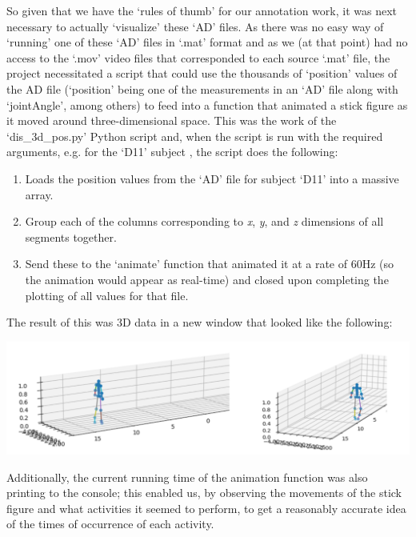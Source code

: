 \documentclass[12pt,twoside]{report}
\begin{document}
\quad So given that we have the ‘rules of thumb’ for our annotation work, it was next necessary to actually ‘visualize’ these ‘AD’ files. As there was no easy way of ‘running’ one of these ‘AD’ files in ‘.mat’ format and as we (at that point) had no access to the ‘.mov’ video files that corresponded to each source ‘.mat’ file, the project necessitated a script that could use the thousands of ‘position’ values of the AD file (‘position’ being one of the measurements in an ‘AD’ file along with ‘jointAngle’, among others) to feed into a function that animated a stick figure as it moved around three-dimensional space. This was the work of the ‘dis\_3d\_pos.py’ Python script and, when the script is run with the required arguments, e.g. for the ‘D11’ subject , the script does the following:

\begin{enumerate}
	\item Loads the position values from the ‘AD’ file for subject ‘D11’ into a massive array.
	\item Group each of the columns corresponding to \textit{x}, \textit{y}, and \textit{z} dimensions of all segments together.
	\item Send these to the ‘animate’ function that animated it at a rate of 60Hz (so the animation would appear as real-time) and closed upon completing the plotting of all values for that file.
\end{enumerate}

\quad The result of this was 3D data in a new window that looked like the following:

\begin{center}
\includegraphics[scale=0.4]{project_figures/fig8_10}
\end{center}

\quad Additionally, the current running time of the animation function was also printing to the console; this enabled us, by observing the movements of the stick figure and what activities it seemed to perform, to get a reasonably accurate idea of the times of occurrence of each activity.\\
\end{document}
